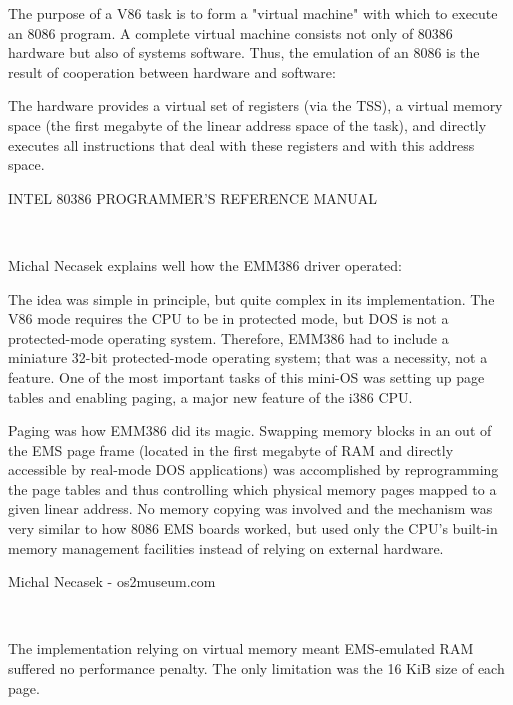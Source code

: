 \begin{fancyquotes}
The purpose of a V86 task is to form a "virtual machine" with which to
execute an 8086 program. A complete virtual machine consists not only of
80386 hardware but also of systems software. Thus, the emulation of an 8086
is the result of cooperation between hardware and software:\\
 \par
 The hardware provides a virtual set of registers (via the TSS), a
 virtual memory space (the first megabyte of the linear address space of
 the task), and directly executes all instructions that deal with these
 registers and with this address space.\\
\par
INTEL 80386 PROGRAMMER'S REFERENCE MANUAL
\end{fancyquotes}\\
\par
Michal Necasek explains well how the EMM386 driver operated:\\
\par
\begin{fancyquotes}
The idea was simple in principle, but quite complex in its implementation. The V86 mode requires the CPU to be in protected mode, but DOS is not a protected-mode operating system. Therefore, EMM386 had to include a miniature 32-bit protected-mode operating system; that was a necessity, not a feature. One of the most important tasks of this mini-OS was setting up page tables and enabling paging, a major new feature of the i386 CPU.\\
\par
Paging was how EMM386 did its magic. Swapping memory blocks in an out of the EMS page frame (located in the first megabyte of RAM and directly accessible by real-mode DOS applications) was accomplished by reprogramming the page tables and thus controlling which physical memory pages mapped to a given linear address. No memory copying was involved and the mechanism was very similar to how 8086 EMS boards worked, but used only the CPU's built-in memory management facilities instead of relying on external hardware.\\
\par
Michal Necasek - os2museum.com
\end{fancyquotes}\\
\par
The implementation relying on virtual memory meant EMS-emulated RAM suffered no performance penalty. The only limitation was the 16 KiB size of each page.



